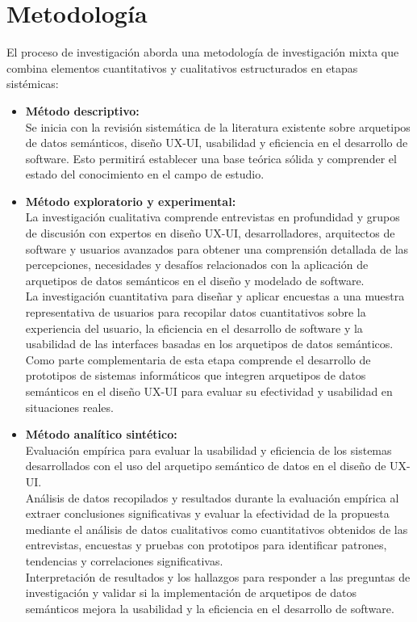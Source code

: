 \documentclass[12pt,a4paper]{article}
\begin{document}
\section{Metodología}
\label{sec:11}
El proceso de investigación aborda una metodología de investigación mixta que combina elementos cuantitativos y cualitativos estructurados en etapas sistémicas:
\begin{itemize}
  \item \textbf{ Método descriptivo: }\\
   Se inicia con la revisión sistemática de la literatura existente sobre arquetipos de datos semánticos, diseño UX-UI, usabilidad y eficiencia en el desarrollo de software. Esto permitirá establecer una base teórica sólida y comprender el estado del conocimiento en el campo de estudio. 
   \item \textbf{ Método exploratorio y experimental: }\\
   La investigación cualitativa comprende entrevistas en profundidad y grupos de discusión con expertos en diseño UX-UI, desarrolladores, arquitectos de software y usuarios avanzados para obtener una comprensión detallada de las percepciones, necesidades y desafíos relacionados con la aplicación de arquetipos de datos semánticos en el diseño y modelado de software. 
   \\
   La investigación cuantitativa para diseñar y aplicar encuestas a una muestra representativa de usuarios para recopilar datos cuantitativos sobre la experiencia del usuario, la eficiencia en el desarrollo de software y la usabilidad de las interfaces basadas en los arquetipos de datos semánticos. 
   \\
   Como parte complementaria de esta etapa comprende el desarrollo de prototipos de sistemas informáticos que integren arquetipos de datos semánticos en el diseño UX-UI para evaluar su efectividad y usabilidad en situaciones reales. 
   \item \textbf{Método analítico sintético:}\\
   Evaluación empírica para evaluar la usabilidad y eficiencia de los sistemas desarrollados con el uso del arquetipo semántico de datos en el diseño de UX-UI. 
   \\
   Análisis de datos recopilados y resultados durante la evaluación empírica al extraer conclusiones significativas y evaluar la efectividad de la propuesta mediante el análisis de datos cualitativos como cuantitativos obtenidos de las entrevistas, encuestas y pruebas con prototipos para identificar patrones, tendencias y correlaciones significativas. 
  \\
   Interpretación de resultados y los hallazgos para responder a las preguntas de investigación y validar si la implementación de arquetipos de datos semánticos mejora la usabilidad y la eficiencia en el desarrollo de software.
\end{itemize}
\end{document}

